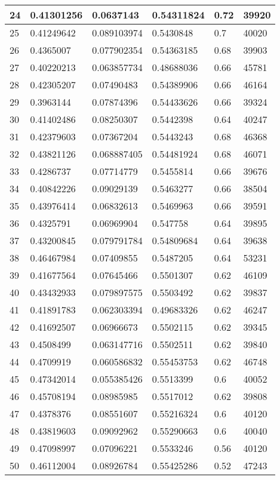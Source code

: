 \begin{longtable}{|l|l|l|l|l|l|}
24 & 0.41301256 & 0.0637143 & 0.54311824 & 0.72 & 39920 \\ \hline 
25 & 0.41249642 & 0.089103974 & 0.5430848 & 0.7 & 40020 \\ \hline 
26 & 0.4365007 & 0.077902354 & 0.54363185 & 0.68 & 39903 \\ \hline 
27 & 0.40220213 & 0.063857734 & 0.48688036 & 0.66 & 45781 \\ \hline 
28 & 0.42305207 & 0.07490483 & 0.54389906 & 0.66 & 46164 \\ \hline 
29 & 0.3963144 & 0.07874396 & 0.54433626 & 0.66 & 39324 \\ \hline 
30 & 0.41402486 & 0.08250307 & 0.5442398 & 0.64 & 40247 \\ \hline 
31 & 0.42379603 & 0.07367204 & 0.5443243 & 0.68 & 46368 \\ \hline 
32 & 0.43821126 & 0.068887405 & 0.54481924 & 0.68 & 46071 \\ \hline 
33 & 0.4286737 & 0.07714779 & 0.5455814 & 0.66 & 39676 \\ \hline 
34 & 0.40842226 & 0.09029139 & 0.5463277 & 0.66 & 38504 \\ \hline 
35 & 0.43976414 & 0.06832613 & 0.5469963 & 0.66 & 39591 \\ \hline 
36 & 0.4325791 & 0.06969904 & 0.547758 & 0.64 & 39895 \\ \hline 
37 & 0.43200845 & 0.079791784 & 0.54809684 & 0.64 & 39638 \\ \hline 
38 & 0.46467984 & 0.07409855 & 0.5487205 & 0.64 & 53231 \\ \hline 
39 & 0.41677564 & 0.07645466 & 0.5501307 & 0.62 & 46109 \\ \hline 
40 & 0.43432933 & 0.079897575 & 0.5503492 & 0.62 & 39837 \\ \hline 
41 & 0.41891783 & 0.062303394 & 0.49683326 & 0.62 & 46247 \\ \hline 
42 & 0.41692507 & 0.06966673 & 0.5502115 & 0.62 & 39345 \\ \hline 
43 & 0.4508499 & 0.063147716 & 0.5502511 & 0.62 & 39840 \\ \hline 
44 & 0.4709919 & 0.060586832 & 0.55453753 & 0.62 & 46748 \\ \hline 
45 & 0.47342014 & 0.055385426 & 0.5513399 & 0.6 & 40052 \\ \hline 
46 & 0.45708194 & 0.08985985 & 0.5517012 & 0.62 & 39808 \\ \hline 
47 & 0.4378376 & 0.08551607 & 0.55216324 & 0.6 & 40120 \\ \hline 
48 & 0.43819603 & 0.09092962 & 0.55290663 & 0.6 & 40040 \\ \hline 
49 & 0.47098997 & 0.07096221 & 0.5533246 & 0.56 & 40120 \\ \hline 
50 & 0.46112004 & 0.08926784 & 0.55425286 & 0.52 & 47243 \\ \hline 
\end{longtable}